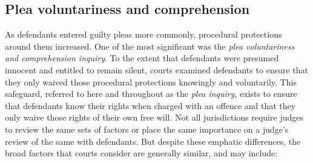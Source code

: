 \subsection{Plea voluntariness and comprehension}

As defendants entered guilty pleas more commonly, procedural protections around them increased. One of the most significant was the \textit{plea voluntariness and comprehension inquiry}. To the extent that defendants were presumed innocent and entitled to remain silent, courts examined defendants to ensure that they only waived those procedural protections knowingly and voluntarily. This safeguard, referred to here and throughout as the \textit{plea inquiry}, exists to ensure that defendants know their rights when charged with an offence and that they only waive those rights of their own free will. Not all jurisdictions require judges to review the same sets of factors or place the same importance on a judge's review of the same with defendants. But despite these emphatic differences, the broad factors that courts consider are generally similar, and may include:


